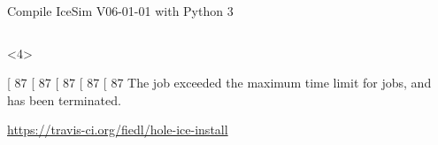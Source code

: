 \begin{frame}[fragile]{\done Compile IceSim V06-01-01 with Python 3}
\begin{columns}
\begin{column}{0.5\textwidth}
\begin{onlyenv}
        \bigskip {}
      \end{onlyenv}
      \begin{onlyenv}<4>
        \begin{bash}
          [ 87%
          [ 87%
          [ 87%
          [ 87%
          [ 87%
          The job exceeded the maximum time limit for jobs, and has been terminated.
        \end{bash}

        \small \url{https://travis-ci.org/fiedl/hole-ice-install} \normalsize
      \end{onlyenv}


    \end{column}
  \end{columns}
\end{frame}

